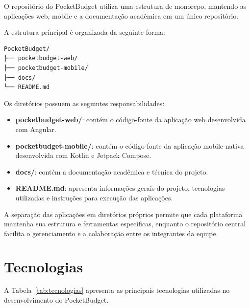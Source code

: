 \documentclass[12pt,a4paper]{article}
\begin{document}
O repositório do PocketBudget utiliza uma estrutura de monorepo, mantendo as aplicações web, mobile e a documentação acadêmica em um único repositório.

A estrutura principal é organizada da seguinte forma:

\begin{verbatim}
PocketBudget/
├── pocketbudget-web/
├── pocketbudget-mobile/
├── docs/
└── README.md
\end{verbatim}

Os diretórios possuem as seguintes responsabilidades:

\begin{itemize}
    \item \textbf{pocketbudget-web/}: contém o código-fonte da aplicação web desenvolvida com Angular.
    
    \item \textbf{pocketbudget-mobile/}: contém o código-fonte da aplicação mobile nativa desenvolvida com Kotlin e Jetpack Compose.
    
    \item \textbf{docs/}: contém a documentação acadêmica e técnica do projeto.
    
    \item \textbf{README.md}: apresenta informações gerais do projeto, tecnologias utilizadas e instruções para execução das aplicações.
\end{itemize}

A separação das aplicações em diretórios próprios permite que cada plataforma mantenha sua estrutura e ferramentas específicas, enquanto o repositório central facilita o gerenciamento e a colaboração entre os integrantes da equipe.

\section{Tecnologias}

A Tabela~\ref{tab:tecnologias} apresenta as principais tecnologias utilizadas no desenvolvimento do PocketBudget.
\end{document}
